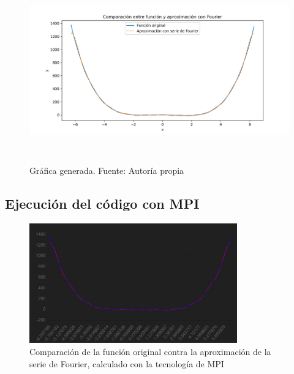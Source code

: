 \begin{enumerate}
	\begin{figure}[H]
		\centering
		\includegraphics[width=6.26772in,height=3.13889in]{media/image30.png}
		\caption{Gráfica generada. Fuente: Autoría propia}
	\end{figure}
	
\end{enumerate}

\subsection{Ejecución del código con MPI}
\begin{figure}[H]
	\includegraphics[width=0.8\textwidth]{media/mpi_grafica.jpeg}
	\caption{Comparación de la función original contra la aproximación de la serie de Fourier, calculado con la tecnología de MPI}
\end{figure}

